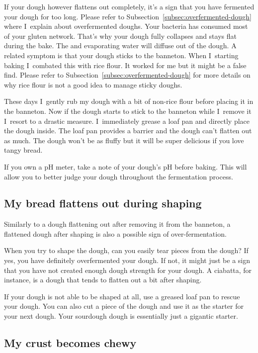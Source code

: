 If your dough however flattens out completely, it's a sign that
you have fermented your dough for too long. Please refer to
Subsection~\ref{subsec:overfermented-dough}
where I~explain about overfermented doughs. Your bacteria
has consumed most of your gluten network. That's why your
dough fully collapses and stays flat during the bake. The
 and evaporating water will diffuse out of the dough.
A related symptom is that your dough sticks to the banneton.
When I~starting baking I~combated this with rice flour.
It worked for me but it might be a false find. Please refer to
Subsection~\ref{subsec:overfermented-dough} for more details on why
rice flour is not a good idea to manage sticky doughs.

These days I~gently rub my
dough with a bit of non-rice flour before placing it in
the banneton. Now if the dough starts to stick to the banneton
while I~remove it I~resort to a drastic measure. I~immediately
grease a loaf pan and directly place the dough inside. The loaf
pan provides a barrier and the dough can't flatten out as much.
The dough won't be as fluffy but it will be super delicious if you love tangy bread.

If you own a pH meter, take a note of your dough's pH before baking.
This will allow you to better judge your dough throughout
the fermentation process.

\subsection{My bread flattens out during shaping}

Similarly to a dough flattening out after removing it from the banneton,
a flattened dough after shaping is also a possible sign of over-fermentation.

When you try to shape the dough, can you easily tear pieces from the dough?
If yes, you have definitely overfermented your dough. If not, it might just
be a sign that you have not created enough dough strength for your dough.
A ciabatta, for instance, is a dough that tends to flatten out a bit after shaping.

If your dough is not able to be shaped at all, use a greased loaf pan
to rescue your dough. You can also cut a piece of the dough and use it
as the starter for your next dough. Your sourdough dough is essentially
just a gigantic starter.

\subsection{My crust becomes chewy}

